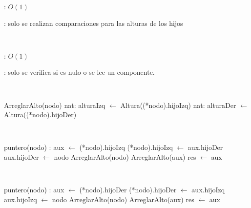 \begin{Algoritmos}
	\complejidad: $O(1)$

	\justifcomp: solo se realizan comparaciones para las alturas de los hijos

	~

	\begin{algorithm}[H]
		\NoCaptionOfAlgo
		\caption{}
		\BlankLine
	\end{algorithm}
	
	\complejidad: $O(1)$

	\justifcomp: solo se verifica si es nulo o se lee un componente.

	~

	\begin{algorithm}[H]
		\NoCaptionOfAlgo
		\caption{}
		\BlankLine
		ArreglarAlto(nodo)
		nat: alturaIzq $\leftarrow$ Altura((*nodo).hijoIzq)
		nat: alturaDer $\leftarrow$ Altura((*nodo).hijoDer)
	\end{algorithm}

	~

	\begin{algorithm}[H]
		\NoCaptionOfAlgo
		\caption{}
		\BlankLine
		puntero(nodo) : aux $\leftarrow$ (*nodo).hijoIzq
		(*nodo).hijoIzq $\leftarrow$ aux.hijoDer
		aux.hijoDer $\leftarrow$ nodo
		ArreglarAlto(nodo)
		ArreglarAlto(aux)
		res $\leftarrow$ aux
	\end{algorithm}

	~

	\begin{algorithm}[H]
		\NoCaptionOfAlgo
		\caption{}
		\BlankLine
		puntero(nodo) : aux $\leftarrow$ (*nodo).hijoDer
		(*nodo).hijoDer $\leftarrow$ aux.hijoIzq
		aux.hijoIzq $\leftarrow$ nodo
		ArreglarAlto(nodo)
		ArreglarAlto(aux)
		res $\leftarrow$ aux
	\end{algorithm}
	

\end{Algoritmos}
